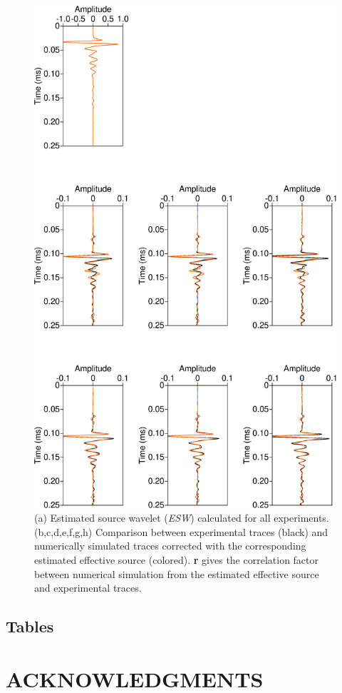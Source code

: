 \documentclass[manuscript,revised]{geophysics}
\begin{document}
\begin{figure}[!h]
	\centering
	\includegraphics[scale=0.4]{fig/panel_srcest_2d_mean.eps}
	\caption{(a) Estimated source wavelet (\textit{ESW}) calculated for all experiments. (b,c,d,e,f,g,h) Comparison between experimental traces (black) and numerically simulated traces corrected with the corresponding estimated effective source (colored). \textbf{r} gives the correlation factor between numerical simulation from the estimated effective source and experimental traces.}
	\label{panel_srcest_2d_mean}
\end{figure}

\clearpage
\newpage

\subsection*{Tables}

\clearpage
\newpage 

\section{ACKNOWLEDGMENTS}

\clearpage
\newpage


\end{document}
